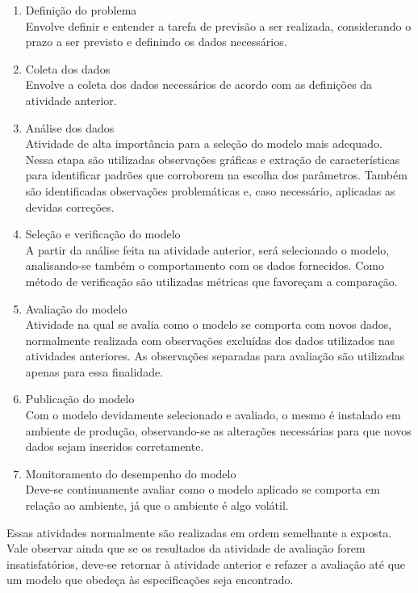 \documentclass[
    12pt,
    oneside,
    a4paper,
    english,
    brazil
]{abntex2}
\begin{document}
\begin{enumerate}
    \item Definição do problema\\
        Envolve  definir e  entender  a  tarefa de  previsão  a ser  realizada,
        considerando o prazo a ser previsto e definindo os dados necessários.
    \item Coleta dos dados\\
        Envolve a coleta  dos dados necessários de acordo com  as definições da
        atividade anterior.
    \item Análise dos dados\\
        Atividade de alta  importância para a seleção do  modelo mais adequado.
        Nessa  etapa   são  utilizadas  observações  gráficas   e  extração  de
        características para identificar padrões  que corroborem na escolha dos
        parâmetros. Também são identificadas  observações problemáticas e, caso
        necessário, aplicadas as devidas correções.
    \item Seleção e verificação do modelo\\
        A partir  da análise  feita na atividade  anterior, será  selecionado o
        modelo, analisando-se  também o comportamento com  os dados fornecidos.
        Como  método de  verificação são  utilizadas métricas  que favoreçam  a
        comparação.
    \item Avaliação do modelo\\
        Atividade na qual se avalia como  o modelo se comporta com novos dados,
        normalmente realizada  com observações  excluídas dos  dados utilizados
        nas atividades anteriores. As  observações separadas para avaliação são
        utilizadas apenas para essa finalidade.
    \item Publicação do modelo\\
        Com o modelo devidamente selecionado e avaliado, o mesmo é instalado em
        ambiente de produção, observando-se  as alterações necessárias para que
        novos dados sejam inseridos corretamente.
    \item Monitoramento do desempenho do modelo\\
        Deve-se continuamente  avaliar como  o modelo  aplicado se  comporta em
        relação ao ambiente, já que o ambiente é algo volátil.
\end{enumerate}

Essas  atividades normalmente  são realizadas  em ordem  semelhante a  exposta.
Vale  observar ainda  que  se os  resultados da  atividade  de avaliação  forem
insatisfatórios, deve-se  retornar à atividade  anterior e refazer  a avaliação
até que um modelo que obedeça às especificações seja encontrado.
\end{document}
